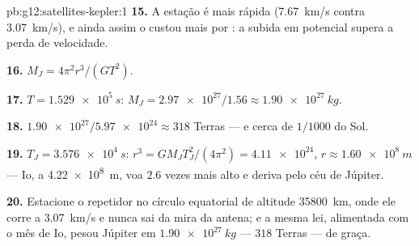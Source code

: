 \begin{solution}{pb:g12:satellites-kepler:1}
\textbf{15.} A estação é mais rápida (\qty{7.67}{km/s} contra
\qty{3.07}{km/s}), e ainda assim o  custou mais 
por : a subida em  potencial supera a perda de
velocidade.

\textbf{16.} $M_J = 4\pi^2 r^3/(G T^2)$.

\textbf{17.} $T = \qty{1.529e5}{s}$: $M_J = \num{2.97e27}/1.56 \approx
\qty{1.90e27}{kg}$.

\textbf{18.} $\num{1.90e27}/\num{5.97e24} \approx 318$ Terras --- e
cerca de $1/1000$ do Sol.

\textbf{19.} $T_J = \qty{3.576e4}{s}$: $r^3 = GM_J T_J^2/(4\pi^2) =
\num{4.11e24}$, $r \approx \qty{1.60e8}{m}$ --- Io, a \qty{4.22e8}{m},
voa $2.6$ vezes mais alto e deriva pelo céu de Júpiter.

\textbf{20.} Estacione o repetidor no círculo equatorial de altitude
\qty{35800}{km}, onde ele corre a \qty{3.07}{km/s} e nunca sai da mira
da antena; e a mesma lei, alimentada com o mês de Io, pesou Júpiter em
$\qty{1.90e27}{kg}$ --- $318$ Terras --- de graça.
\end{solution}
